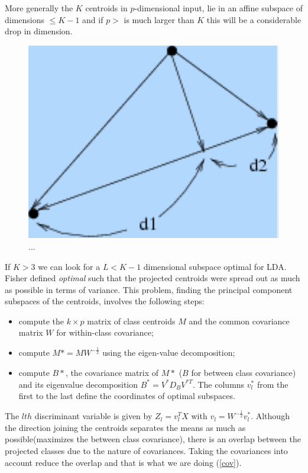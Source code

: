 \documentclass[12pt, letterpaper]{article}
\theoremstyle{definition}
\begin{document}
More generally the $K$ centroids in $p$-dimensional input, lie in an affine subspace of dimensions $\le K-1$ and if $p>$ is much larger than $K$ this will be a considerable drop in dimension.


\begin{figure}
\centering
\includegraphics[scale=0.4]{img/proj}
\caption{...}
\label{proj}
\end{figure}

If $K>3$ we can look for a $L<K-1$ dimensional subspace optimal for LDA. Fisher defined \textit{optimal} such that the projected centroids were spread out as much as possible in terms of variance.
This problem, finding the principal component subspaces of the centroids, involves the following steps:
\begin{itemize}
\item compute the $k\times p$ matrix of class centroids $M$ and the common covariance matrix $W$ for within-class covariance;
\item compute $M*=MW^{-\frac{1}{2}}$ using the eigen-value decomposition;
\item compute $B*$, the covariance matrix of $M*$ ($B$ for between class covariance) and its eigenvalue decomposition $B^{*}=V^{*}D_BV^{*T}$. The columns $v^*_l$ from the first to the last define the coordinates of optimal subspaces.
\end{itemize}
The $lth$ discriminant variable is given by $Z_l =  v_l^TX$ with $v_l=W^{-\frac{1}{2}} v^*_l$.  Although the direction joining the centroids separates the means as much as possible(maximizes the between class covariance), there is an overlap between the projected classes due to the nature of covariances. Taking the covariances into account reduce the overlap and that is what we are doing (\ref{cov}).
\end{document}
